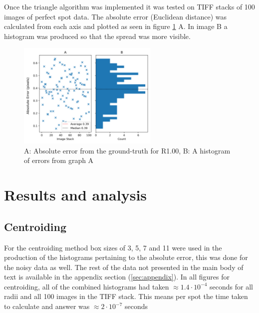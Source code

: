 \documentclass[aps,pra,a4paper,nofootinbib,onecolumn,tightenlines,longbibliography,12pt,amsfonts,amssymb,amsmath,floatfix]{revtex4-2} %
\begin{document}
    Once the triangle algorithm was implemented it was tested on TIFF stacks of 100 images 
    of perfect spot data. The absolute error (Euclidean distance) was calculated from each 
    axis and plotted as seen in figure \ref{fig:single_histo} A. In image B a histogram 
    was produced so that the spread was more visible.

    \begin{figure}[H]
    \begin{center}
      \includegraphics[width=0.6\textwidth]{project_pics/single_histo.png}
    \end{center}
    \caption{A: Absolute error from the ground-truth for R1.00, B: A histogram of errors from graph A}
    \label{fig:single_histo}
  \end{figure}
    
    

\section{Results and analysis} %
\label{sec:Results}

  \subsection{Centroiding} %
  \label{sub:Centroiding_results}

  For the centroiding method box sizes of 3, 5, 7 and 11 were used in the production 
  of the histograms pertaining to the absolute error, this was done for the noisy data as 
  well. The rest of the data not presented in the main body of text is available in the appendix 
  section (\ref{sec:appendix}). In all figures for centroiding, all of the combined histograms had 
  taken $\approx 1.4\cdot 10^{-4}$ seconds for all radii and all 100 images in the TIFF stack. This means per 
  spot the time taken to calculate and answer was $\approx 2\cdot 10^{-7}$ seconds
\end{document}
